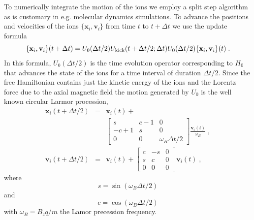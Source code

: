 \documentclass[aps, pra, preprint]{revtex4-1}
\newcommand{\hzero}{H_0}
\begin{document}
To numerically integrate the motion of the ions we employ a split
step algorithm as is customary in e.g. molecular dynamics
simulations. To advance the positions and velocities of the ions
$\{\mathbf{x}_i, \mathbf{v}_i\}$
from time $t$ to $t + \Delta t$ we use the update formula
\begin{equation}
  \{\mathbf{x}_i, \mathbf{v}_i\}(t+\Delta t) =
  U_{0}(\Delta t /2)
  U_{\rm kick}(t + \Delta t / 2; \Delta t)
  U_{0}(\Delta t /2)
  \{\mathbf{x}_i, \mathbf{v}_i\}(t)\;.
\end{equation}
In this formula, $U_{0}(\Delta t/2)$ is the time evolution
operator corresponding to $\hzero$ that advances the state of
the ions for a time interval of duration $\Delta t / 2$. Since
the free Hamiltonian contains just the kinetic energy of the ions
and the Lorentz force due to the axial magnetic field the motion
generated by $U_{0}$ is the well known circular Larmor
procession,
\begin{eqnarray}
  \mathbf{x}_i(t + \Delta t / 2) &=&
                                   \mathbf{x}_i(t)+\\
  &&
      \left[\begin{array}{ccc}
        s & c - 1 & 0\\
        -c + 1 & s & 0\\
        0 & 0 & \omega_B\Delta t / 2
      \end{array}\right]\frac{\mathbf{v}_i(t)}{\omega_B}\;,\nonumber\\
  \mathbf{v}_i(t+\Delta t/2) &=&\mathbf{v}_i(t) + \left[\begin{array}{ccc}
        c & -s & 0\\
        s & c & 0\\
        0 & 0 & 0
      \end{array}\right]\mathbf{v}_i(t)\;,
\end{eqnarray}
where
\begin{equation}
  s = \sin(\omega_B \Delta t / 2)
\end{equation}
and
\begin{equation}
  c = \cos(\omega_B \Delta t / 2)
\end{equation}
with $\omega_B=B_zq/m$ the Lamor precession frequency.
\end{document}
